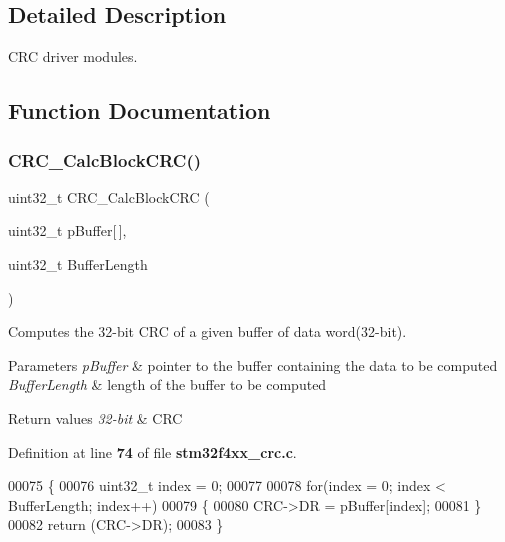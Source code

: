 \subsection{Detailed Description}
C\+RC driver modules. 



\subsection{Function Documentation}
\mbox{\label{group__CRC_gab15ebf620615c360048fb4f45b15fae6}} 
\subsubsection{C\+R\+C\+\_\+\+Calc\+Block\+C\+R\+C()}
{\footnotesize\ttfamily uint32\+\_\+t C\+R\+C\+\_\+\+Calc\+Block\+C\+RC (\begin{DoxyParamCaption}\item[{uint32\+\_\+t}]{p\+Buffer[$\,$],  }\item[{uint32\+\_\+t}]{Buffer\+Length }\end{DoxyParamCaption})}



Computes the 32-\/bit C\+RC of a given buffer of data word(32-\/bit). 


\begin{DoxyParams}{Parameters}
{\em p\+Buffer} & pointer to the buffer containing the data to be computed \\
\hline
{\em Buffer\+Length} & length of the buffer to be computed \\
\hline
\end{DoxyParams}

\begin{DoxyRetVals}{Return values}
{\em 32-\/bit} & C\+RC \\
\hline
\end{DoxyRetVals}


Definition at line \textbf{ 74} of file \textbf{ stm32f4xx\+\_\+crc.\+c}.


\begin{DoxyCode}
00075 \{
00076   uint32\_t index = 0;
00077   
00078   \textcolor{keywordflow}{for}(index = 0; index < BufferLength; index++)
00079   \{
00080     CRC->DR = pBuffer[index];
00081   \}
00082   \textcolor{keywordflow}{return} (CRC->DR);
00083 \}
\end{DoxyCode}
\mbox{\label{group__CRC_ga5407fdbb8e8c9be6322cc8856ae5db3b}} 
